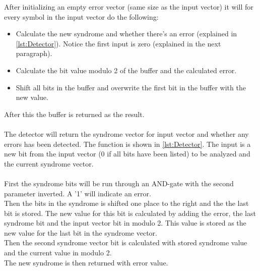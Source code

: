 \documentclass[Main]{subfiles}
\begin{document}
After initializing an empty error vector (same size as the input vector) it will for every symbol in the input vector do the following:
\begin{itemize}

\item Calculate the new syndrome and whether there's an error (explained in \codeTitle \ref{lst:Detector}). Notice the first input is zero (explained in the next paragraph).

\item Calculate the bit value modulo 2 of the buffer and the calculated error.

\item Shift all bits in the buffer and overwrite the first bit in the buffer with the new value.
\end{itemize}
After this the buffer is returned as the result.
\\
\\
The detector will return the syndrome vector for input vector and whether any errors has been detected.
The function is shown in \codeTitle \ref{lst:Detector}.
The input is a new bit from the input vector (0 if all bits have been listed) to be analyzed and the current syndrome vector.
\\
\\
First the syndrome bits will be run through an AND-gate with the second parameter inverted.
A '1' will indicate an error.
\\
Then the bits in the syndrome is shifted one place to the right and the the last bit is stored.
The new value for this bit is calculated by adding the error, the last syndrome bit and the input vector bit in modulo 2.
This value is stored as the new value for the last bit in the syndrome vector.
\\
Then the second syndrome vector bit is calculated with stored syndrome value and the current value in modulo 2.
\\
The new syndrome is then returned with error value.
\end{document}
